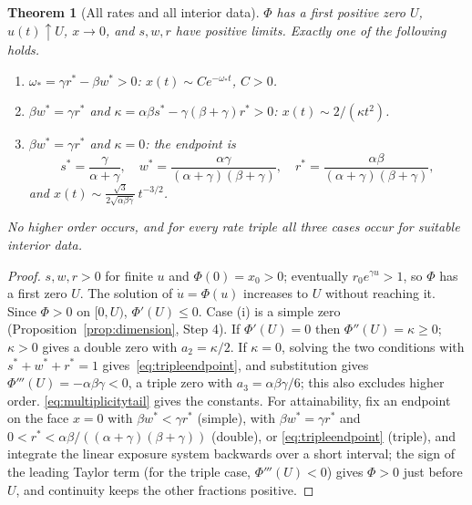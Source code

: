 \documentclass[11pt,a4paper]{article}
\newtheorem{theorem}{Theorem}[section]
\theoremstyle{definition}\newtheorem{definition}[theorem]{Definition}
\theoremstyle{remark}\newtheorem{remark}[theorem]{Remark}
\begin{document}
\begin{theorem}[All rates and all interior data]
\label{thm:classification}
$\Phi$ has a first positive zero $U$, $u(t)\uparrow U$, $x\to0$, and
$s,w,r$ have positive limits. Exactly one of the following holds.
\begin{enumerate}[label=(\roman*)]
\item $\omega_*=\gamma r^*-\beta w^*>0$: $x(t)\sim Ce^{-\omega_*t}$, $C>0$.
\item $\beta w^*=\gamma r^*$ and $\kappa=\alpha\beta s^*-\gamma(\beta+\gamma)r^*>0$:
$x(t)\sim2/(\kappa t^2)$.
\item $\beta w^*=\gamma r^*$ and $\kappa=0$: the endpoint is
\begin{equation}
s^*=\frac\gamma{\alpha+\gamma},\quad
w^*=\frac{\alpha\gamma}{(\alpha+\gamma)(\beta+\gamma)},\quad
r^*=\frac{\alpha\beta}{(\alpha+\gamma)(\beta+\gamma)},
\label{eq:tripleendpoint}
\end{equation}
and $x(t)\sim\frac{\sqrt3}{2\sqrt{\alpha\beta\gamma}}\,t^{-3/2}$.
\end{enumerate}
No higher order occurs, and for every rate triple all three cases
occur for suitable interior data.
\end{theorem}
\begin{proof}
$s,w,r>0$ for finite $u$ and $\Phi(0)=x_0>0$; eventually $r_0e^{\gamma u}>1$,
so $\Phi$ has a first zero $U$. The solution of $\dot u=\Phi(u)$
increases to $U$ without reaching it. Since $\Phi>0$ on $[0,U)$,
$\Phi'(U)\le0$. Case (i) is a simple zero
(Proposition~\ref{prop:dimension}, Step 4). If $\Phi'(U)=0$ then
$\Phi''(U)=\kappa\ge0$; $\kappa>0$ gives a double zero with
$a_2=\kappa/2$. If $\kappa=0$, solving the two conditions with
$s^*+w^*+r^*=1$ gives~\eqref{eq:tripleendpoint}, and substitution gives
$\Phi'''(U)=-\alpha\beta\gamma<0$, a triple zero with
$a_3=\alpha\beta\gamma/6$; this also excludes higher order.
\eqref{eq:multiplicitytail} gives the constants. For attainability, fix
an endpoint on the face $x=0$ with $\beta w^*<\gamma r^*$ (simple), with
$\beta w^*=\gamma r^*$ and
$0<r^*<\alpha\beta/((\alpha+\gamma)(\beta+\gamma))$ (double), or
\eqref{eq:tripleendpoint} (triple), and integrate the linear exposure
system backwards over a short interval; the sign of the leading Taylor
term (for the triple case, $\Phi'''(U)<0$) gives $\Phi>0$ just before
$U$, and continuity keeps the other fractions positive.
\end{proof}
\end{document}
